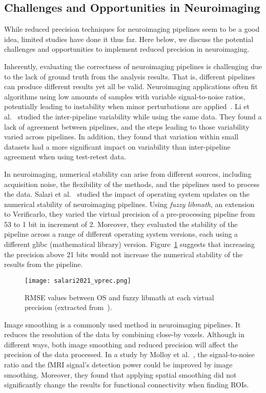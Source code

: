 \subsection{Challenges and Opportunities in Neuroimaging}
While reduced precision techniques for neuroimaging pipelines seem to be a
good idea, limited studies have done it thus far.
Here below, we discuss the potential challenges and opportunities to implement
reduced precision in neuroimaging.
	
Inherently, evaluating the correctness of neuroimaging pipelines is challenging due to the lack of ground truth from the analysis results.
That is, different pipelines can produce different results yet all be valid.
Neuroimaging applications often fit algorithms using low amounts of samples with variable
signal-to-noise ratios, potentially leading to instability when minor perturbations are applied~\cite{Kiar2020-uv}.
Li et al.~\cite{Li2021-om} studied the inter-pipeline variability while using the same data.
They found a lack of agreement between pipelines, and the steps leading to those variability varied across pipelines.
In addition, they found that variation within small datasets had a more significant impact
on variability than inter-pipeline agreement when using test-retest data. 
	
In neuroimaging, numerical stability can arise from different sources, including
acquisition noise, the flexibility of the methods, and the pipelines used to process the data.
Salari et al.~\cite{Salari2021-kd} studied the impact of operating system updates on
the numerical stability of neuroimaging pipelines.
Using \textit{fuzzy libmath}, an extension to Verificarlo, they varied the virtual
precision of a pre-processing pipeline from 53 to 1 bit in increment of 2.
Moreover, they evaluated the stability of the pipeline across a range of different
operating system versions, each using a different glibc (mathematical library) version.
Figure~\ref{fig:salari2021_vprec} suggests that increasing the precision above 21 bits
would not increase the numerical stability of the results from the pipeline.
\begin{figure}[h]
	\centering
	\texttt{[image: salari2021\_vprec.png]}
	\caption{RMSE values between OS and fuzzy libmath at each virtual precision (extracted from~\cite{Salari2021-kd}).}
	\label{fig:salari2021_vprec}
\end{figure}
	
Image smoothing is a commonly used method in neuroimaging pipelines.
It reduces the resolution of the data by combining close-by voxels.
Although in different ways, both image smoothing and reduced precision will affect
the precision of the data processed.
In a study by Molloy et al.~\cite{Molloy2014-oc}, the signal-to-noise ratio and
the fMRI signal's detection power could be improved by image smoothing. 
Moreover, they found that applying spatial smoothing did not significantly change the
results for functional connectivity when finding ROIs.
	
